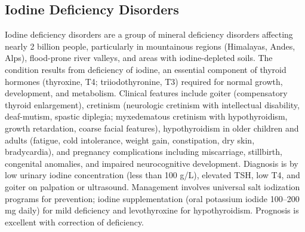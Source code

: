 \subsection{Iodine Deficiency Disorders}
\label{sec:Iodine Deficiency Disorders}
Iodine deficiency disorders are a group of mineral deficiency disorders affecting nearly 2 billion people, particularly in mountainous regions (Himalayas, Andes, Alps), flood-prone river valleys, and areas with iodine-depleted soils. The condition results from deficiency of iodine, an essential component of thyroid hormones (thyroxine, T4; triiodothyronine, T3) required for normal growth, development, and metabolism. Clinical features include goiter (compensatory thyroid enlargement), cretinism (neurologic cretinism with intellectual disability, deaf-mutism, spastic diplegia; myxedematous cretinism with hypothyroidism, growth retardation, coarse facial features), hypothyroidism in older children and adults (fatigue, cold intolerance, weight gain, constipation, dry skin, bradycardia), and pregnancy complications including miscarriage, stillbirth, congenital anomalies, and impaired neurocognitive development. Diagnosis is by low urinary iodine concentration (less than 100 \textmu g/L), elevated TSH, low T4, and goiter on palpation or ultrasound. Management involves universal salt iodization programs for prevention; iodine supplementation (oral potassium iodide 100--200 mg daily) for mild deficiency and levothyroxine for hypothyroidism. Prognosis is excellent with correction of deficiency.

